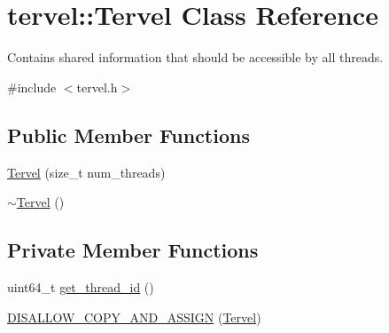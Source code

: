 \hypertarget{classtervel_1_1_tervel}{}\section{tervel\+:\+:Tervel Class Reference}
\label{classtervel_1_1_tervel}


Contains shared information that should be accessible by all threads.  




{\ttfamily \#include $<$tervel.\+h$>$}

\subsection*{Public Member Functions}
\begin{DoxyCompactItemize}
\item 
\hyperlink{classtervel_1_1_tervel_aae87ace03f0fb62083e3683f99135a00}{Tervel} (size\+\_\+t num\+\_\+threads)
\item 
\hyperlink{classtervel_1_1_tervel_aea18e9dcc8a8212c0c451a94bc9ff522}{$\sim$\+Tervel} ()
\end{DoxyCompactItemize}
\subsection*{Private Member Functions}
\begin{DoxyCompactItemize}
\item 
uint64\+\_\+t \hyperlink{classtervel_1_1_tervel_a89db2253e58923a4d113bb3a5f197b47}{get\+\_\+thread\+\_\+id} ()
\item 
\hyperlink{classtervel_1_1_tervel_ae4aafbeaaa2d0c95ca825b3ec9db0c5d}{D\+I\+S\+A\+L\+L\+O\+W\+\_\+\+C\+O\+P\+Y\+\_\+\+A\+N\+D\+\_\+\+A\+S\+S\+I\+G\+N} (\hyperlink{classtervel_1_1_tervel}{Tervel})
\end{DoxyCompactItemize}
